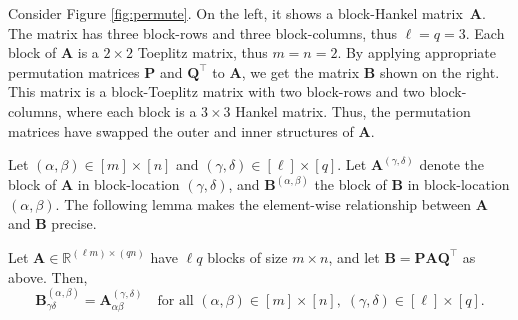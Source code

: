 \documentclass{siamart251216}
\newcommand{\RR}[2]{\mathbb{R}^{#1 \times #2}}
\def\bA{\mathbf{A}}
\def\bB{\mathbf{B}}
\def\bP{\mathbf{P}}
\def\bQ{\mathbf{Q}}
\begin{document}
\begin{example}
    Consider Figure \ref{fig:permute}. On the left, it shows a block-Hankel matrix~$\bA$. The matrix has three block-rows and three block-columns, thus $\ell = q = 3$. Each block of $\bA$ is a $2\times 2$ Toeplitz matrix, thus $m=n=2$. By applying appropriate permutation matrices $\bP$ and $\bQ^\top$ to $\bA$, we get the matrix $\bB$ shown on the right. This matrix is a block-Toeplitz matrix with two block-rows and two block-columns, where each block is a $3\times 3$ Hankel matrix. Thus, the permutation matrices have swapped the outer and inner structures of $\bA$.
\end{example}

Let $(\alpha,\beta)\in[m]\times[n]$ and $(\gamma,\delta)\in[\ell]\times[q]$. Let $\bA^{(\gamma, \delta)}$ denote the block of $\bA$ in block-location $(\gamma,\delta)$, and $\bB^{(\alpha, \beta)}$ the block of $\bB$ in block-location $(\alpha,\beta)$. The following lemma makes the element-wise relationship between $\bA$ and $\bB$ precise.

\begin{lemma}\label{lemma:permutation}
Let $\bA\in\RR{(\ell m)}{(qn)}$ have $\ell q$ blocks of size $m\times n$, and let $\bB = \bP\bA\bQ^\top$ as above. Then,
\begin{equation}
\label{eq:element_swap}
    \bB^{(\alpha,\beta)}_{\gamma\delta} = \bA^{(\gamma,\delta)}_{\alpha\beta}
    \quad\text{for all }(\alpha,\beta)\in[m]\times[n],\;(\gamma,\delta)\in[\ell]\times[q].
\end{equation}
\end{lemma}
\end{document}
